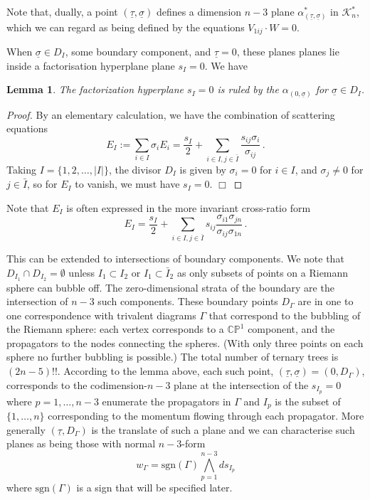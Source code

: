 \documentclass[11pt]{article}
\newcommand{\CP}{\mathbb{CP}}
\newcommand{\cK}{\mathcal{K}}
\newcommand{\sgn}{\mathrm{sgn}}
\newcommand{\bs}{\underline{\sigma}}
\newcommand{\bt}{\underline{\tau}}
\newcommand{\1}{{\rm 1\hskip-0.25em I}}
\newtheorem{lemma}{Lemma}[section]
\begin{document}
Note that, dually, a point $(\bt,\bs)$ defines a dimension $n-3$ plane $\alpha_{(\bt,\bs)}^*$ in $\cK_n^*$, which we can regard as being defined by the equations $V_{1ij}\cdot W = 0$. 

When $\bs \in D_I$, some boundary component,  and $\bt=0$,   these planes planes lie inside a factorisation hyperplane plane $s_I=0$. We have
\begin{lemma}
The factorization hyperplane $s_I=0$ is ruled by the $\alpha_{(0,\bs)}$ for $\bs\in D_I$.
\end{lemma} 

\begin{proof}
By an elementary calculation, we have the combination of scattering equations
\begin{equation}
E_I:=\sum_{i\in I} \sigma_iE_i=\frac{s_I}2  + \sum_{i\in I, j\in \bar I} \frac{s_{ij} \sigma_i}{\sigma_{ij}}\, .
\end{equation}
Taking $I=\{1,2,\ldots,|I|\}$, the divisor $D_I$ is given by $\sigma_i=0$ for $i\in I$, and $\sigma_j\neq 0$ for $j\in \bar I$, so for $E_I$ to vanish, we must have $s_I=0$. $\Box$

\end{proof}
Note that $E_I$ is often expressed in the  more invariant cross-ratio form
\begin{equation}
E_I=\frac{s_I}{2} + \sum_{i\in I, j\in \bar I} s_{ij} \frac{\sigma_{i1}\sigma_{jn}}{\sigma_{ij}\sigma_{1n}}\, .
\end{equation}

This can be extended to intersections of boundary components.  We note that $D_{I_1}\cap D_{I_2}=\emptyset$ unless $I_1\subset I_2$ or $I_1\subset \bar I_2$ as only subsets of points on a Riemann sphere can bubble off.  The zero-dimensional strata of the boundary are the intersection of $n-3$ such components.  These boundary points $D_\Gamma$ are in one to one correspondence with trivalent diagrams $\Gamma$ that  correspond to the bubbling of the Riemann sphere:  each vertex corresponds to a $\CP^1$ component, and the propagators to the nodes connecting the spheres.  (With only three points on each sphere no further bubbling is possible.) The total number of ternary trees is $(2n-5)!!$. According to the lemma above, each such point, $(\bt,\bs)=(0,D_\Gamma)$, corresponds to the codimension-$n-3$ plane at the intersection of the $s_{I_p}=0$ where $p=1,\ldots , n-3$ enumerate the propagators in $\Gamma$ and $I_p$ is the subset of $\{1, \ldots ,n\}$ corresponding to the momentum flowing through each propagator.  More generally $(\bt, D_\Gamma)$ is the translate of such a plane and we can characterise such planes as being those with normal $n-3$-form
 \begin{equation}
 w_\Gamma= \sgn(\Gamma)\bigwedge_{p=1}^{n-3} d s_{I_p}
 \end{equation}
 where $\sgn(\Gamma)$ is a sign that will be specified later.
\end{document}
